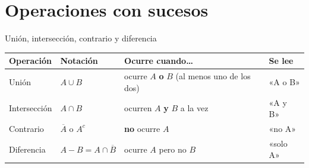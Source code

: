 \documentclass[11pt,a4paper]{article}
\begin{document}
\section{Operaciones con sucesos}\hypertarget{sec2}{}

\begin{fmdef}{Unión, intersección, contrario y diferencia}
\begin{center}\renewcommand{\arraystretch}{1.5}\small\begin{tabularx}{\linewidth}{>{\raggedright\arraybackslash}p{3.2cm}>{\raggedright\arraybackslash}X>{\raggedright\arraybackslash}X>{\raggedright\arraybackslash}X}\toprule
\textbf{Operación} & \textbf{Notación} & \textbf{Ocurre cuando\dots{}} & \textbf{Se lee}\\\midrule
Unión & $A\cup B$ & ocurre $A$ \textbf{o} $B$ (al menos uno de los dos) & «A o B»\\[3pt]
Intersección & $A\cap B$ & ocurren $A$ \textbf{y} $B$ a la vez & «A y B»\\[3pt]
Contrario & $\overline{A}$ o $A^c$ & \textbf{no} ocurre $A$ & «no A»\\[3pt]
Diferencia & $A-B=A\cap\overline{B}$ & ocurre $A$ pero no $B$ & «solo A»\\[3pt]
\bottomrule\end{tabularx}\end{center}


\end{fmdef}
\end{document}
